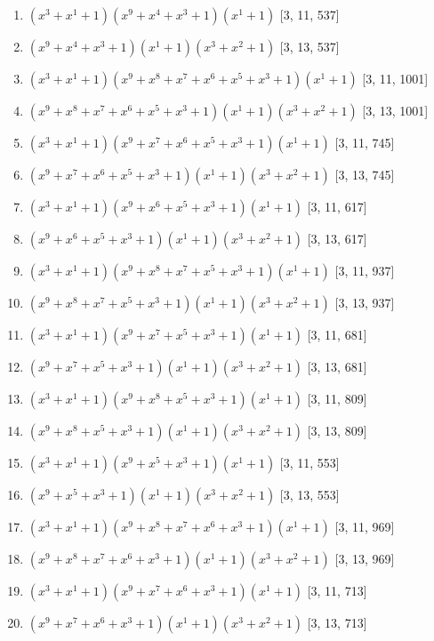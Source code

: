 \documentclass[10pt,twocolumn]{article}
\begin{document}
\begin{enumerate}
\item $(x^{3} + x^{1} + 1)(x^{9} + x^{4} + x^{3} + 1)(x^{1} + 1)$  [3, 11, 537]
\item $(x^{9} + x^{4} + x^{3} + 1)(x^{1} + 1)(x^{3} + x^{2} + 1)$  [3, 13, 537]
\item $(x^{3} + x^{1} + 1)(x^{9} + x^{8} + x^{7} + x^{6} + x^{5} + x^{3} + 1)(x^{1} + 1)$  [3, 11, 1001]
\item $(x^{9} + x^{8} + x^{7} + x^{6} + x^{5} + x^{3} + 1)(x^{1} + 1)(x^{3} + x^{2} + 1)$  [3, 13, 1001]
\item $(x^{3} + x^{1} + 1)(x^{9} + x^{7} + x^{6} + x^{5} + x^{3} + 1)(x^{1} + 1)$  [3, 11, 745]
\item $(x^{9} + x^{7} + x^{6} + x^{5} + x^{3} + 1)(x^{1} + 1)(x^{3} + x^{2} + 1)$  [3, 13, 745]
\item $(x^{3} + x^{1} + 1)(x^{9} + x^{6} + x^{5} + x^{3} + 1)(x^{1} + 1)$  [3, 11, 617]
\item $(x^{9} + x^{6} + x^{5} + x^{3} + 1)(x^{1} + 1)(x^{3} + x^{2} + 1)$  [3, 13, 617]
\item $(x^{3} + x^{1} + 1)(x^{9} + x^{8} + x^{7} + x^{5} + x^{3} + 1)(x^{1} + 1)$  [3, 11, 937]
\item $(x^{9} + x^{8} + x^{7} + x^{5} + x^{3} + 1)(x^{1} + 1)(x^{3} + x^{2} + 1)$  [3, 13, 937]
\item $(x^{3} + x^{1} + 1)(x^{9} + x^{7} + x^{5} + x^{3} + 1)(x^{1} + 1)$  [3, 11, 681]
\item $(x^{9} + x^{7} + x^{5} + x^{3} + 1)(x^{1} + 1)(x^{3} + x^{2} + 1)$  [3, 13, 681]
\item $(x^{3} + x^{1} + 1)(x^{9} + x^{8} + x^{5} + x^{3} + 1)(x^{1} + 1)$  [3, 11, 809]
\item $(x^{9} + x^{8} + x^{5} + x^{3} + 1)(x^{1} + 1)(x^{3} + x^{2} + 1)$  [3, 13, 809]
\item $(x^{3} + x^{1} + 1)(x^{9} + x^{5} + x^{3} + 1)(x^{1} + 1)$  [3, 11, 553]
\item $(x^{9} + x^{5} + x^{3} + 1)(x^{1} + 1)(x^{3} + x^{2} + 1)$  [3, 13, 553]
\item $(x^{3} + x^{1} + 1)(x^{9} + x^{8} + x^{7} + x^{6} + x^{3} + 1)(x^{1} + 1)$  [3, 11, 969]
\item $(x^{9} + x^{8} + x^{7} + x^{6} + x^{3} + 1)(x^{1} + 1)(x^{3} + x^{2} + 1)$  [3, 13, 969]
\item $(x^{3} + x^{1} + 1)(x^{9} + x^{7} + x^{6} + x^{3} + 1)(x^{1} + 1)$  [3, 11, 713]
\item $(x^{9} + x^{7} + x^{6} + x^{3} + 1)(x^{1} + 1)(x^{3} + x^{2} + 1)$  [3, 13, 713]

\end{enumerate}
\end{document}
